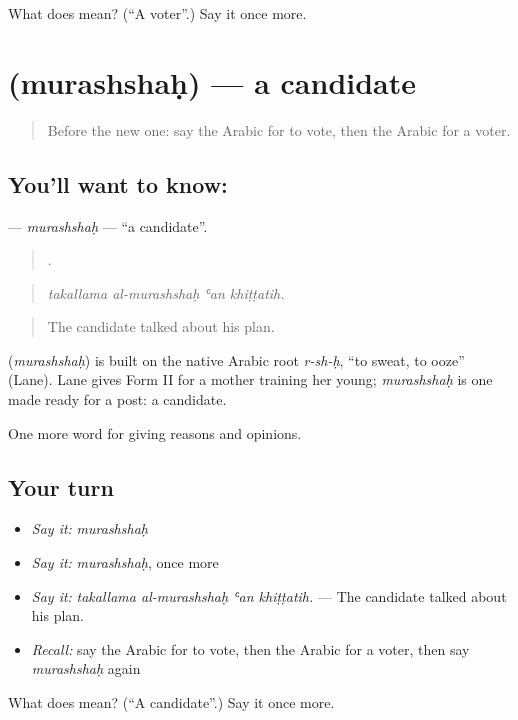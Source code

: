 \begin{tcolorbox}[breakable,colback=teal!4,colframe=teal!35!black,title={Before you move on}]
What does  mean? (\textquotedblleft{}A voter\textquotedblright{}.) Say it once more.
\end{tcolorbox}
\section[\texorpdfstring{\ar{مرشح} (murashshaḥ)}{مرشح (murashshaḥ)}]{ (murashshaḥ) — a candidate}

\label{lesson:AR-C378-murashshah}



\begin{quote}
Before the new one: say the Arabic for to vote, then the Arabic for a voter.
\end{quote}

\subsection*{You'll want to know: }
\textbf{} — \emph{murashshaḥ} — \textquotedblleft{}a candidate\textquotedblright{}.

\begin{quote}
   .
\end{quote}

\begin{quote}
\emph{takallama al-murashshaḥ ʿan khiṭṭatih.}
\end{quote}

\begin{quote}
The candidate talked about his plan.
\end{quote}

\begin{cousinweb}
\textbf{} (\emph{murashshaḥ}) is built on the native Arabic root \emph{r-sh-ḥ}, \textquotedblleft{}to sweat, to ooze\textquotedblright{} (Lane). Lane gives Form II for a mother training her young; \emph{murashshaḥ} is one made ready for a post: a candidate.
\end{cousinweb}

\begin{grammarlens}[title={What you've built}]
One more word for giving reasons and opinions.
\end{grammarlens}

\subsection*{Your turn}
\begin{itemize}
\raggedright
  \item \emph{Say it:} \emph{murashshaḥ}
  \item \emph{Say it:} \emph{murashshaḥ}, once more
  \item \emph{Say it:} \emph{takallama al-murashshaḥ ʿan khiṭṭatih.} — The candidate talked about his plan.
  \item \emph{Recall:} say the Arabic for to vote, then the Arabic for a voter, then say \emph{murashshaḥ} again
\end{itemize}

\begin{tcolorbox}[breakable,colback=teal!4,colframe=teal!35!black,title={Before you move on}]
What does  mean? (\textquotedblleft{}A candidate\textquotedblright{}.) Say it once more.
\end{tcolorbox}
